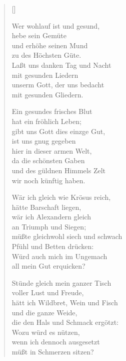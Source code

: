 \begin{multicols}{2}
\settowidth{\versewidth}{Wär ich gleich wie Krösus reich,}
\begin{verse}[\versewidth]

 Wer wohlauf ist und gesund,\\
hebe sein Gemüte\\
und erhöhe seinen Mund\\
zu des Höchsten Güte.\\
Laßt uns danken Tag und Nacht\\
mit gesunden Liedern\\
unserm Gott, der uns bedacht\\
mit gesunden Gliedern.

 Ein gesundes frisches Blut\\
hat ein fröhlich Leben;\\
gibt uns Gott dies einzge Gut,\\
ist uns gnug gegeben\\
hier in dieser armen Welt,\\
da die schönsten Gaben\\
und des güldnen Himmels Zelt\\
wir noch künftig haben.

 Wär ich gleich wie Krösus reich,\\
hätte Barschaft liegen,\\
wär ich Alexandern gleich\\
an Triumph und Siegen;\\
müßte gleichwohl siech und schwach\\
Pfühl und Betten drücken:\\
Würd auch mich im Ungemach\\
all mein Gut erquicken?

 Stünde gleich mein ganzer Tisch\\
voller Lust und Freude,\\
hätt ich Wildbret, Wein und Fisch\\
und die ganze Weide,\\
die den Hals und Schmack ergötzt:\\
Wozu würd es nützen,\\
wenn ich dennoch ausgesetzt\\
müßt in Schmerzen sitzen?


\end{verse}
\end{multicols}
